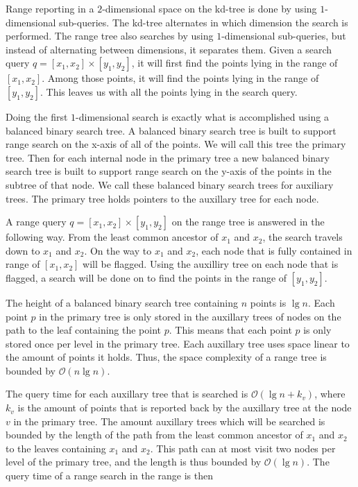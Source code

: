 Range reporting in a $2$-dimensional space on the kd-tree is done by using $1$-dimensional sub-queries. The kd-tree alternates in which dimension the search is performed. The range tree also searches by using $1$-dimensional sub-queries, but instead of alternating between dimensions, it separates them. Given a search query $q = [x_1, x_2] \times [y_1, y_2]$, it will first find the points lying in the range of $[x_1, x_2]$. Among those points, it will find the points lying in the range of $[y_1, y_2]$. This leaves us with all the points lying in the search query.

Doing the first $1$-dimensional search is exactly what is accomplished using a balanced binary search tree. A balanced binary search tree is built to support range search on the x-axis of all of the points. We will call this tree the primary tree. Then for each internal node in the primary tree a new balanced binary search tree is built to support range search on the y-axis of the points in the subtree of that node. We call these balanced binary search trees for auxiliary trees. The primary tree holds pointers to the auxillary tree for each node.

A range query $q = [x_1, x_2] \times [y_1, y_2]$ on the range tree is answered in the following way. From the least common ancestor of $x_1$ and $x_2$, the search travels down to $x_1$ and $x_2$. On the way to $x_1$ and $x_2$, each node that is fully contained in range of $[x_1, x_2]$ will be flagged. Using the auxilliry tree on each node that is flagged, a search will be done on to find the points in the range of $[y_1, y_2]$.

The height of a balanced binary search tree containing $n$ points is $\lg n$. Each point $p$ in the primary tree is only stored in the auxillary trees of nodes on the path to the leaf containing the point $p$. This means that each point $p$ is only stored once per level in the primary tree. Each auxillary tree uses space linear to the amount of points it holds. Thus, the space complexity of a range tree is bounded by $\mathcal{O}(n \lg n)$.

The query time for each auxillary tree that is searched is $\mathcal{O}(\lg n + k_v)$, where $k_v$ is the amount of points that is reported back by the auxillary tree at the node $v$ in the primary tree. The amount auxillary trees which will be searched is bounded by the length of the path from the least common ancestor of $x_1$ and $x_2$ to the leaves containing $x_1$ and $x_2$. This path can at most visit two nodes per level of the primary tree, and the length is thus bounded by $\mathcal{O}(\lg n)$. The query time of a range search in the range is then 

